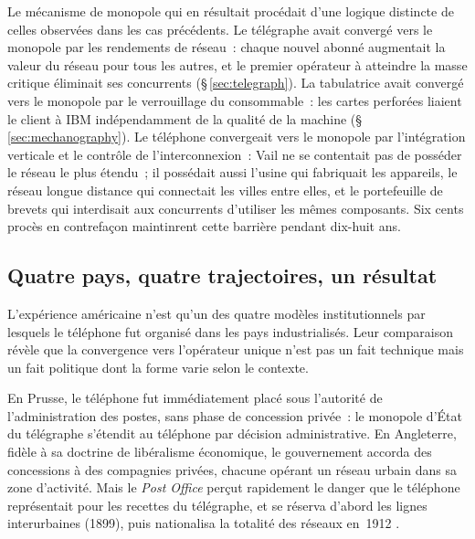 %
Le mécanisme de monopole qui en résultait procédait d'une logique distincte de celles observées dans les cas précédents. Le télégraphe avait convergé vers le monopole par les rendements de réseau~: chaque nouvel abonné augmentait la valeur du réseau pour tous les autres, et le premier opérateur à atteindre la masse critique éliminait ses concurrents (§\,\ref{sec:telegraph}). La tabulatrice avait convergé vers le monopole par le verrouillage du consommable~: les cartes perforées liaient le client à IBM indépendamment de la qualité de la machine (§\,\ref{sec:mechanography}). Le téléphone convergeait vers le monopole par l'intégration verticale et le contrôle de l'interconnexion~: Vail ne se contentait pas de posséder le réseau le plus étendu~; il possédait aussi l'usine qui fabriquait les appareils, le réseau longue distance qui connectait les villes entre elles, et le portefeuille de brevets qui interdisait aux concurrents d'utiliser les mêmes composants. Six cents procès en contrefaçon maintinrent cette barrière pendant dix-huit ans.



\subsection{Quatre pays, quatre trajectoires, un résultat}\label{subsec:quatre_pays}

L'expérience américaine n'est qu'un des quatre modèles institutionnels par lesquels le téléphone fut organisé dans les pays industrialisés. Leur comparaison révèle que la convergence vers l'opérateur unique n'est pas un fait technique mais un fait politique dont la forme varie selon le contexte.

%
En Prusse, le téléphone fut immédiatement placé sous l'autorité de l'administration des postes, sans phase de concession privée~: le monopole d'État du télégraphe s'étendit au téléphone par décision administrative. En Angleterre, fidèle à sa doctrine de libéralisme économique, le gouvernement accorda des concessions à des compagnies privées, chacune opérant un réseau urbain dans sa zone d'activité. Mais le \emph{Post Office} perçut rapidement le danger que le téléphone représentait pour les recettes du télégraphe, et se réserva d'abord les lignes interurbaines (1899), puis nationalisa la totalité des réseaux en~1912 \parencite{bertho_histoire_1984}.

